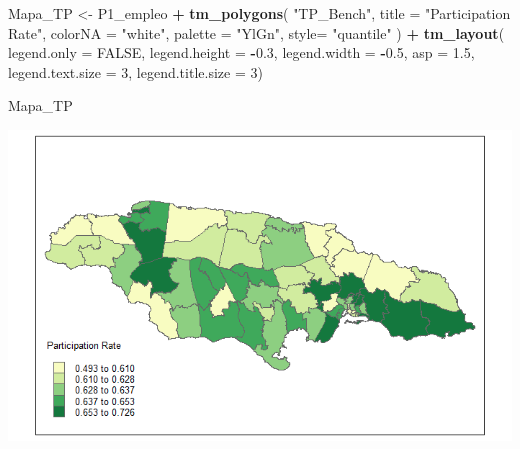 \documentclass[
  12pt,
]{book}
\newenvironment{Shaded}{\begin{snugshade}}{\end{snugshade}}
\newcommand{\AttributeTok}[1]{\textcolor[rgb]{0.13,0.29,0.53}{#1}}
\newcommand{\ConstantTok}[1]{\textcolor[rgb]{0.56,0.35,0.01}{#1}}
\newcommand{\DecValTok}[1]{\textcolor[rgb]{0.00,0.00,0.81}{#1}}
\newcommand{\FloatTok}[1]{\textcolor[rgb]{0.00,0.00,0.81}{#1}}
\newcommand{\FunctionTok}[1]{\textcolor[rgb]{0.13,0.29,0.53}{\textbf{#1}}}
\newcommand{\NormalTok}[1]{#1}
\newcommand{\OtherTok}[1]{\textcolor[rgb]{0.56,0.35,0.01}{#1}}
\newcommand{\SpecialCharTok}[1]{\textcolor[rgb]{0.81,0.36,0.00}{\textbf{#1}}}
\newcommand{\StringTok}[1]{\textcolor[rgb]{0.31,0.60,0.02}{#1}}
\begin{document}
\begin{Shaded}
\begin{Highlighting}[]
\NormalTok{Mapa\_TP }\OtherTok{\textless{}{-}}
\NormalTok{  P1\_empleo }\SpecialCharTok{+} \FunctionTok{tm\_polygons}\NormalTok{(}
    \StringTok{"TP\_Bench"}\NormalTok{,}
    \AttributeTok{title =}  \StringTok{"Participation Rate"}\NormalTok{,}
    \AttributeTok{colorNA =} \StringTok{"white"}\NormalTok{,}
    \AttributeTok{palette =} \StringTok{"YlGn"}\NormalTok{,}
    \AttributeTok{style=} \StringTok{"quantile"}
\NormalTok{  ) }\SpecialCharTok{+} \FunctionTok{tm\_layout}\NormalTok{( }
    \AttributeTok{legend.only =} \ConstantTok{FALSE}\NormalTok{,}
    \AttributeTok{legend.height =} \SpecialCharTok{{-}}\FloatTok{0.3}\NormalTok{,}
    \AttributeTok{legend.width =} \SpecialCharTok{{-}}\FloatTok{0.5}\NormalTok{,}
    \AttributeTok{asp =} \FloatTok{1.5}\NormalTok{,}
    \AttributeTok{legend.text.size =} \DecValTok{3}\NormalTok{,}
    \AttributeTok{legend.title.size =} \DecValTok{3}\NormalTok{)}

\NormalTok{Mapa\_TP}
\end{Highlighting}
\end{Shaded}

\includegraphics{Recursos/05_Empleo/17_map_TP.png}
\end{document}

